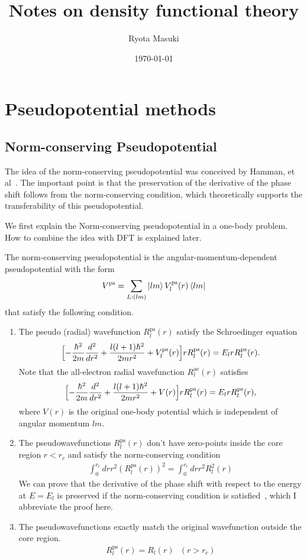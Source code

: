 \documentclass{article}
\title{Notes on density functional theory}
\author{Ryota Masuki}
\date{\today}
\begin{document}
\maketitle

\section{Pseudopotential methods}
\subsection{Norm-conserving Pseudopotential}
The idea of the norm-conserving pseudopotential was conceived by Hamman, et al~\cite{PhysRevLett.43.1494}.
The important point is that the preservation of the derivative of the phase shift follows from the norm-conserving condition,
which theoretically supports the transferability of this pseudopotential.

We first explain the Norm-conserving pseudopotential in a one-body problem.
How to combine the idea with DFT is explained later.

The norm-conserving pseudopotential is the angular-momentum-dependent pseudopotential with the form
\begin{align}
  V^{\text{ps}} = \sum_{L:(lm)} \ket{lm} V^{\text{ps}}_l(r) \bra{lm}
\end{align}
that satisfy the following condition.
\begin{enumerate}
  \item The pseudo (radial) wavefunction $R^{\text{ps}}_l(r)$ satisfy the Schroedinger equation
  \begin{align}
    \Bigl[
      - \frac{\hbar^2}{2m} \frac{d^2}{dr^2} + \frac{l(l+1)\hbar^2}{2mr^2} + V^{\text{ps}}_l(r)
    \Bigr] rR^{\text{ps}}_l(r) = E_l r R^{\text{ps}}_l(r).
  \end{align}
  Note that the all-electron radial wavefunction $R^{\text{ae}}_l(r)$ satisfies
  \begin{align}
    \Bigl[
      - \frac{\hbar^2}{2m} \frac{d^2}{dr^2} + \frac{l(l+1)\hbar^2}{2mr^2} + V(r)
    \Bigr] rR^{\text{ps}}_l(r) = E_l r R^{\text{ps}}_l(r),
  \end{align}
  where $V(r)$ is the original one-body potential which is independent of angular momentum $lm$.
  \item The pseudowavefunctions $R^{\text{ps}}_l(r)$ don't have zero-points inside the core region $r<r_c$ and satisfy the norm-conserving condition
  \begin{align}
    \int_0^{r_c} dr r^2 (R^{\text{ps}}_l(r))^2 = \int_0^{r_c} dr r^2 R_l^2(r)
  \end{align}
  We can prove that the derivative of the phase shift with respect to the energy at $E = E_l$ is preserved if the norm-conserving condition is satisfied~\cite{PhysRevLett.43.1494, Fujiwara_Kotaidenshikouzou}, which I abbreviate the proof here.
  \item The pseudowavefunctions exactly match the original wavefunction outside the core region.
  \begin{align}
   R^{\text{ps}}_l(r)= R_l(r) \text{\ }(r > r_c)
  \end{align}
\end{enumerate}
\end{document}
